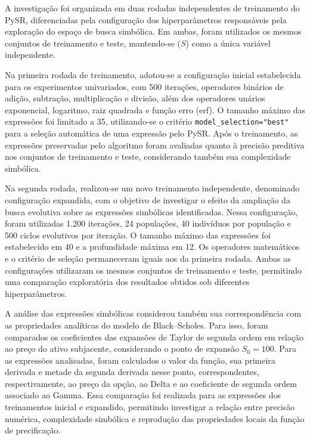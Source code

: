 A investigação foi organizada em duas rodadas independentes de treinamento do PySR, diferenciadas pela configuração dos hiperparâmetros responsáveis pela exploração do espaço de busca simbólica. Em ambas, foram utilizados os mesmos conjuntos de treinamento e teste, mantendo-se ($S$) como a única variável independente.

Na primeira rodada de treinamento, adotou-se a configuração inicial estabelecida para os experimentos univariados, com 500 iterações, operadores binários de adição, subtração, multiplicação e divisão, além dos operadores unários exponencial, logaritmo, raiz quadrada e função erro (erf). O tamanho máximo das expressões foi limitado a 35, utilizando-se o critério \texttt{model\_selection="best"} para a seleção automática de uma expressão pelo PySR. Após o treinamento, as expressões preservadas pelo algoritmo foram avaliadas quanto à precisão preditiva nos conjuntos de treinamento e teste, considerando também sua complexidade simbólica.

Na segunda rodada, realizou-se um novo treinamento independente, denominado configuração expandida, com o objetivo de investigar o efeito da ampliação da busca evolutiva sobre as expressões simbólicas identificadas. Nessa configuração, foram utilizadas 1.200 iterações, 24 populações, 40 indivíduos por população e 500 ciclos evolutivos por iteração. O tamanho máximo das expressões foi estabelecido em 40 e a profundidade máxima em 12. Os operadores matemáticos e o critério de seleção permaneceram iguais aos da primeira rodada. Ambas as configurações utilizaram os mesmos conjuntos de treinamento e teste, permitindo uma comparação exploratória dos resultados obtidos sob diferentes hiperparâmetros.

A análise das expressões simbólicas considerou também sua correspondência com as propriedades analíticas do modelo de Black--Scholes. Para isso, foram comparados os coeficientes das expansões de Taylor de segunda ordem em relação ao preço do ativo subjacente, considerando o ponto de expansão $S_0=100$. Para as expressões analisadas, foram calculados o valor da função, sua primeira derivada e metade da segunda derivada nesse ponto, correspondentes, respectivamente, ao preço da opção, ao Delta e ao coeficiente de segunda ordem associado ao Gamma. Essa comparação foi realizada para as expressões dos treinamentos inicial e expandido, permitindo investigar a relação entre precisão numérica, complexidade simbólica e reprodução das propriedades locais da função de precificação.

